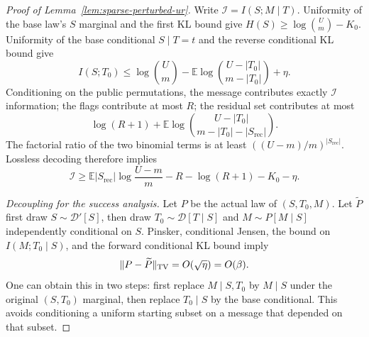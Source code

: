 \documentclass[11pt,letterpaper]{article}
\numberwithin{equation}{section}
\newcommand{\E}{\mathbb E}
\begin{document}
\begin{proof}[Proof of Lemma~\ref{lem:sparse-perturbed-ur}]
Write $\mathcal I=I(S;M\mid T)$.
Uniformity of the base law's $S$ marginal and the first KL bound give $H(S)\ge\log\binom{U}{m}-K_0$.
Uniformity of the base conditional $S\mid T=t$ and the reverse conditional KL bound give
\[
 I(S;T_0)\le\log\binom{U}{m}
 -\E\log\binom{U-|T_0|}{m-|T_0|}+\eta.
\]
Conditioning on the public permutations, the message contributes exactly $\mathcal I$ information; the flags contribute at most $R$; the residual set contributes at most
\[
 \log(R+1)+
 \E\log\binom{U-|T_0|}{m-|T_0|-|S_{\mathrm{rec}}|}.
\]
The factorial ratio of the two binomial terms is at least $((U-m)/m)^{|S_{\mathrm{rec}}|}$.
Lossless decoding therefore implies
\begin{equation}
 \mathcal I\ge
  \E|S_{\mathrm{rec}}|\log\frac{U-m}{m}
  -R-\log(R+1)-K_0-\eta.
 \label{eq:sparse-encoding}
\end{equation}

\emph{Decoupling for the success analysis.} Let $P$ be the actual law of $(S,T_0,M)$.
Let $\widetilde P$ first draw $S\sim\mathcal D'[S]$, then draw $T_0\sim\mathcal D[T\mid S]$ and $M\sim P[M\mid S]$ independently conditional on $S$.
Pinsker, conditional Jensen, the bound on $I(M;T_0\mid S)$, and the forward conditional KL bound imply
\begin{equation}
 \|P-\widetilde P\|_{\rm TV}=O(\sqrt\eta)=O(\beta).
 \label{eq:sparse-decoupling}
\end{equation}
One can obtain this in two steps: first replace $M\mid S,T_0$ by $M\mid S$ under the original $(S,T_0)$ marginal, then replace $T_0\mid S$ by the base conditional.
This avoids conditioning a uniform starting subset on a message that depended on that subset.


\end{proof}
\end{document}
